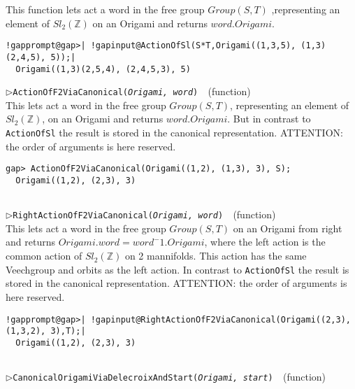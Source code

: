 \documentclass[a4paper,11pt]{report}
\begin{document}
{{{ This function lets act a word in the free group $Group(S, T)$ ,representing an element of $Sl_2 (\mathbb{Z})$ on an Origami and returns $word.Origami$. 
\begin{Verbatim}[commandchars=!@|,fontsize=\small,frame=single,label=Example]
  !gapprompt@gap>| !gapinput@ActionOfSl(S*T,Origami((1,3,5), (1,3)(2,4,5), 5));|
  Origami((1,3)(2,5,4), (2,4,5,3), 5)
\end{Verbatim}
 \noindent\textcolor{FuncColor}{$\triangleright$\enspace\texttt{ActionOfF2ViaCanonical({\mdseries\slshape Origami, word})
\label{ActionOfF2ViaCanonical}
}\hfill{\scriptsize (function)}}\\


 This lets act a word in the free group $Group(S, T)$, representing an element of $Sl_2(\mathbb{Z})$, on an Origami and returns $word.Origami$. But in contrast to \texttt{ActionOfSl} the result is stored in the canonical representation. ATTENTION: the order of
arguments is here reserved. 
\begin{Verbatim}[commandchars=!@|,fontsize=\small,frame=single,label=Example]
    gap> ActionOfF2ViaCanonical(Origami((1,2), (1,3), 3), S);
  Origami((1,2), (2,3), 3)
    
\end{Verbatim}
 \noindent\textcolor{FuncColor}{$\triangleright$\enspace\texttt{RightActionOfF2ViaCanonical({\mdseries\slshape Origami, word})
\label{RightActionOfF2ViaCanonical}
}\hfill{\scriptsize (function)}}\\


 This lets act a word in the free group $Group(S, T)$ on an Origami from right and returns $Origami.word = word^-1.Origami$, where the left action is the common action of $Sl_2(\mathbb{Z})$ on 2 mannifolds. This action has the same Veechgroup and orbits as the left
action. In contrast to \texttt{ActionOfSl} the result is stored in the canonical representation. ATTENTION: the order of
arguments is here reserved. 
\begin{Verbatim}[commandchars=!@|,fontsize=\small,frame=single,label=Example]
  !gapprompt@gap>| !gapinput@RightActionOfF2ViaCanonical(Origami((2,3), (1,3,2), 3),T);|
  Origami((1,2), (2,3), 3)
   
\end{Verbatim}
 \noindent\textcolor{FuncColor}{$\triangleright$\enspace\texttt{CanonicalOrigamiViaDelecroixAndStart({\mdseries\slshape Origami, start})
\label{CanonicalOrigamiViaDelecroixAndStart}
}\hfill{\scriptsize (function)}}\\


}}}
\end{document}
